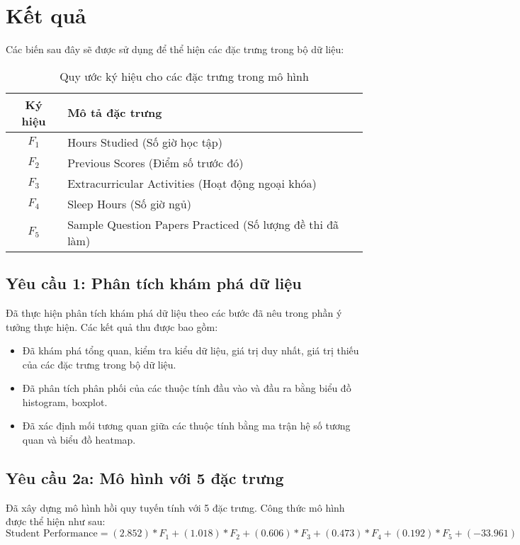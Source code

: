 \section{Kết quả}
Các biến sau đây sẽ được sử dụng để thể hiện các đặc trưng trong bộ dữ liệu:
\begin{table}[H]
	\centering
	\begin{tabular}{|c|l|}
		\hline
		\textbf{Ký hiệu} & \textbf{Mô tả đặc trưng}                                  \\
		\hline
		$F_1$            & Hours Studied (Số giờ học tập)                            \\
		$F_2$            & Previous Scores (Điểm số trước đó)                        \\
		$F_3$            & Extracurricular Activities (Hoạt động ngoại khóa)         \\
		$F_4$            & Sleep Hours (Số giờ ngủ)                                  \\
		$F_5$            & Sample Question Papers Practiced (Số lượng đề thi đã làm) \\
		\hline
	\end{tabular}
	\caption{Quy ước ký hiệu cho các đặc trưng trong mô hình}
\end{table}
\subsection{Yêu cầu 1: Phân tích khám phá dữ liệu}
Đã thực hiện phân tích khám phá dữ liệu theo các bước đã nêu trong phần ý tưởng thực hiện. Các kết quả thu được bao gồm:
\begin{itemize}
	\item Đã khám phá tổng quan, kiểm tra kiểu dữ liệu, giá trị duy nhất, giá trị thiếu của các đặc trưng trong bộ dữ liệu.
	\item Đã phân tích phân phối của các thuộc tính đầu vào và đầu ra bằng biểu đồ histogram, boxplot.
	\item Đã xác định mối tương quan giữa các thuộc tính bằng ma trận hệ số tương quan và biểu đồ heatmap.
\end{itemize}

\subsection{Yêu cầu 2a: Mô hình với 5 đặc trưng}
Đã xây dựng mô hình hồi quy tuyến tính với 5 đặc trưng. Công thức mô hình được thể hiện như sau:
$$\text{Student Performance} = (2.852)*F_1 + (1.018)*F_2 + (0.606)*F_3 + (0.473)*F_4 + (0.192)*F_5 + (-33.961)$$

